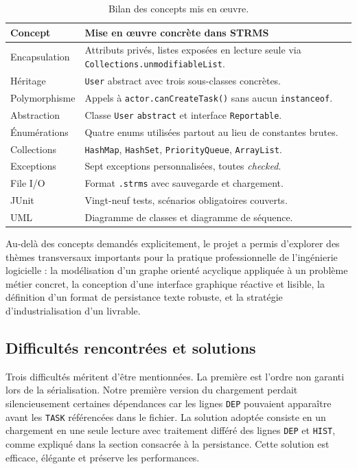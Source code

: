 \documentclass[11pt]{article}
\begin{document}
\begin{table}[H]
\centering
\small
\begin{tabular}{lp{8.5cm}}
\toprule
\textbf{Concept} & \textbf{Mise en \oe uvre concrète dans STRMS} \\
\midrule
Encapsulation     & Attributs privés, listes exposées en lecture seule via \texttt{Collections.unmodifiableList}. \\
Héritage          & \texttt{User} abstract avec trois sous-classes concrètes. \\
Polymorphisme     & Appels à \texttt{actor.canCreateTask()} sans aucun \texttt{instanceof}. \\
Abstraction       & Classe \texttt{User} \texttt{abstract} et interface \texttt{Reportable}. \\
Énumérations      & Quatre enums utilisées partout au lieu de constantes brutes. \\
Collections       & \texttt{HashMap}, \texttt{HashSet}, \texttt{PriorityQueue}, \texttt{ArrayList}. \\
Exceptions        & Sept exceptions personnalisées, toutes \textit{checked}. \\
File I/O          & Format \texttt{.strms} avec sauvegarde et chargement. \\
JUnit             & Vingt-neuf tests, scénarios obligatoires couverts. \\
UML               & Diagramme de classes et diagramme de séquence. \\
\bottomrule
\end{tabular}
\caption{Bilan des concepts mis en \oe uvre.}
\end{table}

Au-delà des concepts demandés explicitement, le projet a permis d'explorer
des thèmes transversaux importants pour la pratique professionnelle de
l'ingénierie logicielle : la modélisation d'un graphe orienté acyclique
appliquée à un problème métier concret, la conception d'une interface
graphique réactive et lisible, la définition d'un format de persistance
texte robuste, et la stratégie d'industrialisation d'un livrable.

\subsection{Difficultés rencontrées et solutions}
Trois difficultés méritent d'être mentionnées. La première est l'ordre
non garanti lors de la sérialisation. Notre première version du
chargement perdait silencieusement certaines dépendances car les lignes
\texttt{DEP} pouvaient apparaître avant les \texttt{TASK} référencées
dans le fichier. La solution adoptée consiste en un chargement en une
seule lecture avec traitement différé des lignes \texttt{DEP} et
\texttt{HIST}, comme expliqué dans la section consacrée à la persistance.
Cette solution est efficace, élégante et préserve les performances.
\end{document}
